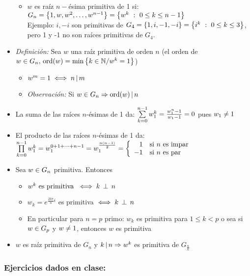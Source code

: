 \documentclass[12pt,a4paper, spanish]{article}
\begin{document}
\begin{itemize}
\begin{itemize}
		      \item $w$ es raíz $n-$ésima primitiva de 1 si:
		            $G_n = \set{1,w,w^2,\dots,w^{n-1}} =
			            \set{w^k\ :\ 0\leq k \leq n-1}$\\
		            Ejemplo: $i, -i$ son primitivas de $G_4 = \set{1,i,-1,-i} = \set{i^k\ :\ 0 \leq k \leq 3}$, pero 1 y -1 no son raíces primitivas de $G_4$.
	      \end{itemize}
	\item \textit{Definición: }
	      Sea $w$ una raíz primitiva de orden $n$ (el orden de
	      $w \en G_n,\, \text{ord}(w) = \text{min}\set{k \en \naturales / w^k = 1}$)
	      \begin{itemize}
		      \item $w^m = 1 \sisolosi n \divideA m$
		      \item \textit{Observación: } Si $w \en G_n \entonces \ord(w) \divideA n$
	      \end{itemize}
	\item La suma de las raíces $n$-ésimas de 1 da:
	      $\sumatoria{k=0}{n-1}w_1^k = \frac{w_1^n -1}{w_1 -1} = 0$ pues $w_1 \distinto 1$
	\item El producto de las raíces $n$-ésimas de 1 da:
	      $\productoria{k=0}{n-1} w_1^k = w_1^{0+1+\dots + n-1} =
		      w_1^{\frac{n(n-1)}{2}} =
		      \llave{rl}{
			      1 & \text{si $n$ es impar}\\
			      -1 & \text{si $n$ es par}
		      }$
	\item Sea $w \en G_n$ primitiva. Entonces
	      \begin{itemize}
		      \item $w^k \text{ es primitiva } \sisolosi k \cop n $
		      \item $w_k = e^{\frac{2k\pi}{n}i}$ es primitiva $\sisolosi k \cop n$
		      \item En particular para $n = p$ primo: $w_k$ es primitiva para $1\leq k < p$ o sea si
		            $w \en G_p$ y $w \distinto 1$, entonces $w$ es primitiva
	      \end{itemize}
        \item $w$ es raíz primitiva de $G_n$ y $k \divideA n \entonces w^k$ es primitiva de $G_\frac{n}{k}$
\end{itemize}

\subsubsection*{Ejercicios dados en clase:}
\ejercicio
\end{document}

